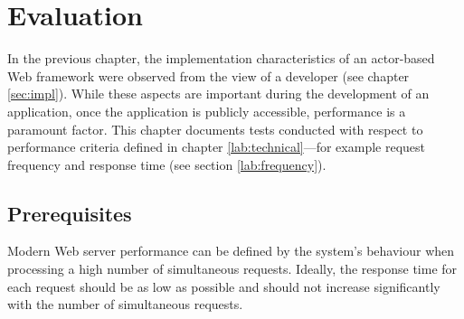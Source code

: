 \chapter{Evaluation}
\label{lab:eval}

In the previous chapter, the implementation characteristics of an actor-based Web framework were observed from the view of a developer (see chapter \ref{sec:impl}). While these aspects are important during the development of an application, once the application is publicly accessible, performance is a paramount factor. This chapter documents tests conducted with respect to performance criteria defined in chapter \ref{lab:technical}---for example request frequency and response time (see section \ref{lab:frequency}).

\section{Prerequisites}

Modern Web server performance can be defined by the system's behaviour when processing a high number of simultaneous requests. Ideally, the response time for each request should be as low as possible and should not increase significantly with the number of simultaneous requests. 

